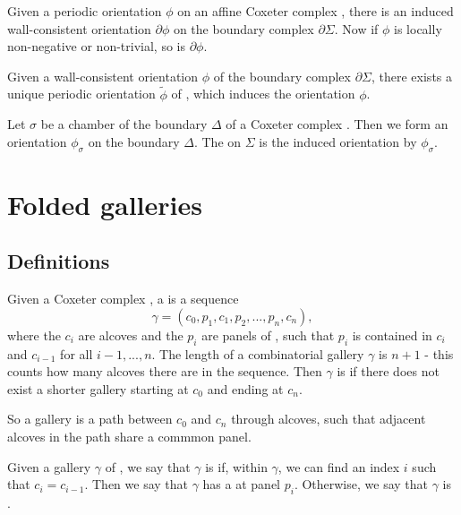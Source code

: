 \documentclass[11pt]{article}
\begin{document}
\begin{lemma}
    Given a periodic orientation $\phi$ on an affine Coxeter complex \sg, there is an induced wall-consistent orientation $\partial\phi$ on the boundary complex $\partial\Sigma$. Now if $\phi$ is locally non-negative or non-trivial, so is $\partial\phi$. 
\end{lemma}

\begin{lemma}
    Given a wall-consistent orientation $\phi$ of the boundary complex $\partial\Sigma$, there exists a unique periodic orientation $\tilde{\phi}$ of \sg, which induces the orientation $\phi$. 
\end{lemma}

\begin{definition}
    Let $\sigma$ be a chamber of the boundary $\Delta$ of a Coxeter complex \sg. Then we form an orientation $\phi_{\sigma}$ on the boundary $\Delta$. The  on $\Sigma$ is the induced orientation by $\phi_{\sigma}$. 
\end{definition}

\section{Folded galleries}

\subsection{Definitions}
\begin{definition}
    Given a Coxeter complex \sg, a  is a sequence
    \[\gamma = (c_0,p_1,c_1,p_2,...,p_n,c_n),\]
    where the $c_i$ are alcoves and the $p_i$ are panels of \sg, such that $p_i$ is contained in $c_i$ and $c_{i-1}$ for all $i-1,...,n$. The length of a combinatorial gallery $\gamma$ is $n+1$ - this counts how many alcoves there are in the sequence. Then $\gamma$ is  if there does not exist a shorter gallery starting at $c_0$ and ending at $c_n$. 
\end{definition}

So a gallery is a path between $c_0$ and $c_n$ through alcoves, such that adjacent alcoves in the path share a commmon panel. 

\begin{definition}
    Given a gallery $\gamma$ of \sg, we say that $\gamma$ is  if, within $\gamma$, we can find an index $i$ such that $c_i=c_{i-1}$. Then we say that $\gamma$ has a  at panel $p_i$. Otherwise, we say that $\gamma$ is .  
\end{definition}
\end{document}
